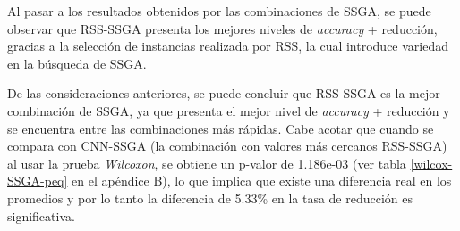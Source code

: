 




Al pasar a los resultados obtenidos por las combinaciones de SSGA, se puede observar que RSS-SSGA presenta los mejores niveles de \emph{accuracy} + reducción, gracias a la selección de instancias realizada por RSS, la cual introduce variedad en la búsqueda de SSGA.

De las consideraciones anteriores, se puede concluir que RSS-SSGA es la mejor combinación de SSGA, ya que presenta el mejor nivel de \emph{accuracy} + reducción y se encuentra entre las combinaciones más rápidas. Cabe acotar que cuando se compara con CNN-SSGA (la combinación con valores más cercanos RSS-SSGA) al usar la prueba \emph{Wilcoxon}, se obtiene un p-valor de 1.186e-03 (ver tabla \ref{wilcox-SSGA-peq} en el apéndice B), lo que implica que existe una diferencia real en los promedios y por lo tanto la diferencia de 5.33\% en la tasa de reducción es significativa.

